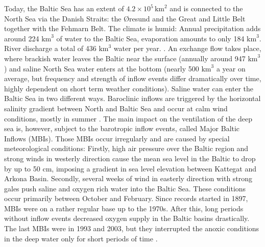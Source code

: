 Today, the Baltic Sea has an extent of $4.2 \times 10^{5} \, \text{km}^2$ 
\citep[][]{balticsea} and is connected to the North Sea via the Danish Straits: 
the \O resund and the Great and Little Belt together with the Fehmarn Belt. The 
climate is humid: Annual precipitation adds around 224 $\text{km}^3$ of water to 
the Baltic Sea, evaporation amounts to only 184 $\text{km}^3$. River discharge a 
total of 436 $\text{km}^3$ water per year. \citep[][]{reissmann2009}. An 
exchange flow takes place, where brackish water leaves the Baltic near the 
surface (annually around 947 $\text{km}^3$) and saline North Sea water enters at 
the bottom (nearly 500 $\text{km}^3$ a year on average, but frequency and 
strength of inflow events differ dramatically over time, highly dependent on 
short term weather conditions). Saline water can enter the Baltic Sea in two 
different ways. Baroclinic inflows 
are triggered by the horizontal salinity gradient between North and Baltic Sea 
and occur at calm wind conditions, mostly in summer \citep[][]{reissmann2009}. 
The main impact on the ventilation of the deep sea is, however, subject to the 
barotropic inflow events, called Major Baltic Inflows (MBIs). Those MBIs occur 
irregularly and are caused by special meteorological conditions: Firstly, high 
air pressure over the Baltic region and strong winds in westerly direction 
cause 
the mean sea level in the Baltic to drop by up to 50 cm, imposing a gradient in 
sea level elevation between Kattegat and Arkona Basin. Secondly, several weeks 
of wind in easterly direction with strong gales \citep[][]{balticsea, 
reissmann2009, mohrholz2015} push saline and oxygen rich water into the Baltic 
Sea.
These conditions occur primarily between October and February. Since records 
started in 1897, MBIs were on a rather regular base up to the 1970s. After 
this, 
long periods without inflow events decreased oxygen supply in the Baltic basins 
drastically. The last MBIs were in 1993 and 2003, but they interrupted the 
anoxic conditions in the deep water only for short periods of time 
\citep[][]{schinke1998, mohrholz2015}. 

